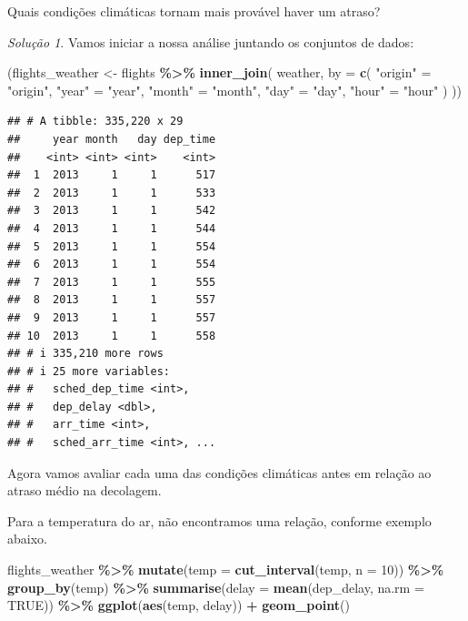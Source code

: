 \documentclass[
]{latex/krantz}
\newenvironment{Shaded}{\begin{snugshade}}{\end{snugshade}}
\newcommand{\AttributeTok}[1]{\textcolor[rgb]{0.13,0.29,0.53}{#1}}
\newcommand{\ConstantTok}[1]{\textcolor[rgb]{0.56,0.35,0.01}{#1}}
\newcommand{\DecValTok}[1]{\textcolor[rgb]{0.00,0.00,0.81}{#1}}
\newcommand{\FunctionTok}[1]{\textcolor[rgb]{0.13,0.29,0.53}{\textbf{#1}}}
\newcommand{\NormalTok}[1]{#1}
\newcommand{\OtherTok}[1]{\textcolor[rgb]{0.56,0.35,0.01}{#1}}
\newcommand{\SpecialCharTok}[1]{\textcolor[rgb]{0.81,0.36,0.00}{\textbf{#1}}}
\newcommand{\StringTok}[1]{\textcolor[rgb]{0.31,0.60,0.02}{#1}}
\theoremstyle{definition}
\theoremstyle{definition}
\theoremstyle{definition}
\theoremstyle{definition}
\theoremstyle{remark}
\newtheorem*{solution}{Solução}
\begin{document}
Quais condições climáticas tornam mais provável haver um atraso?

\begin{solution}
Vamos iniciar a nossa análise juntando os conjuntos de dados:

\begin{Shaded}
\begin{Highlighting}[]
\NormalTok{(flights\_weather }\OtherTok{\textless{}{-}}\NormalTok{ flights }\SpecialCharTok{\%\textgreater{}\%}
  \FunctionTok{inner\_join}\NormalTok{(}
\NormalTok{    weather, }
    \AttributeTok{by =} \FunctionTok{c}\NormalTok{(}
      \StringTok{"origin"} \OtherTok{=} \StringTok{"origin"}\NormalTok{,}
      \StringTok{"year"} \OtherTok{=} \StringTok{"year"}\NormalTok{,}
      \StringTok{"month"} \OtherTok{=} \StringTok{"month"}\NormalTok{,}
      \StringTok{"day"} \OtherTok{=} \StringTok{"day"}\NormalTok{,}
      \StringTok{"hour"} \OtherTok{=} \StringTok{"hour"}
\NormalTok{    )}
\NormalTok{  ))}
\end{Highlighting}
\end{Shaded}

\begin{verbatim}
## # A tibble: 335,220 x 29
##     year month   day dep_time
##    <int> <int> <int>    <int>
##  1  2013     1     1      517
##  2  2013     1     1      533
##  3  2013     1     1      542
##  4  2013     1     1      544
##  5  2013     1     1      554
##  6  2013     1     1      554
##  7  2013     1     1      555
##  8  2013     1     1      557
##  9  2013     1     1      557
## 10  2013     1     1      558
## # i 335,210 more rows
## # i 25 more variables:
## #   sched_dep_time <int>,
## #   dep_delay <dbl>,
## #   arr_time <int>,
## #   sched_arr_time <int>, ...
\end{verbatim}

Agora vamos avaliar cada uma das condições climáticas antes em relação ao atraso médio na decolagem.

Para a temperatura do ar, não encontramos uma relação, conforme exemplo abaixo.

\begin{Shaded}
\begin{Highlighting}[]
\NormalTok{flights\_weather }\SpecialCharTok{\%\textgreater{}\%}
  \FunctionTok{mutate}\NormalTok{(}\AttributeTok{temp =} \FunctionTok{cut\_interval}\NormalTok{(temp, }\AttributeTok{n =} \DecValTok{10}\NormalTok{)) }\SpecialCharTok{\%\textgreater{}\%}
  \FunctionTok{group\_by}\NormalTok{(temp) }\SpecialCharTok{\%\textgreater{}\%}
  \FunctionTok{summarise}\NormalTok{(}\AttributeTok{delay =} \FunctionTok{mean}\NormalTok{(dep\_delay, }\AttributeTok{na.rm =} \ConstantTok{TRUE}\NormalTok{)) }\SpecialCharTok{\%\textgreater{}\%}
  \FunctionTok{ggplot}\NormalTok{(}\FunctionTok{aes}\NormalTok{(temp, delay)) }\SpecialCharTok{+}
    \FunctionTok{geom\_point}\NormalTok{()}
\end{Highlighting}
\end{Shaded}


\end{solution}
\end{document}
